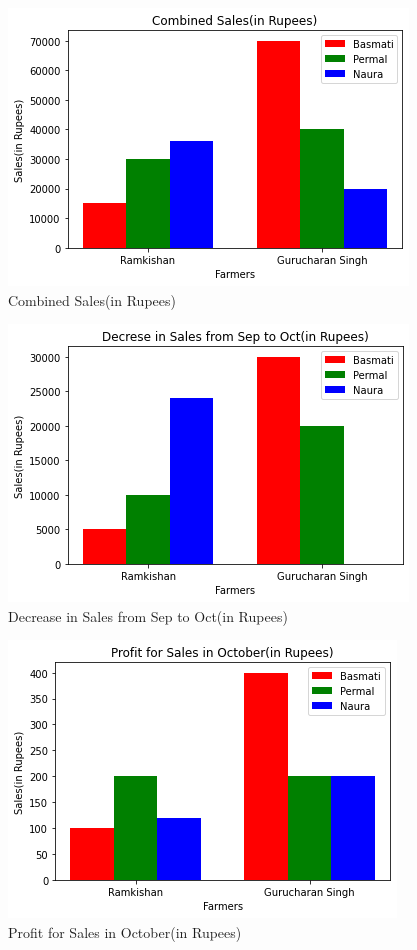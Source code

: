 \begin{figure}[!ht]
\centering
\includegraphics[width=\columnwidth]{solutions/su2021/56/Figures/Figure10_3}
\caption{Combined Sales(in Rupees)}
\label{matrix/56fig:Combined}	
\end{figure}


\begin{figure}[!ht]
\centering
\includegraphics[width=\columnwidth]{solutions/su2021/56/Figures/Figure10_4}
\caption{Decrease in Sales from Sep to Oct(in Rupees)}
\label{matrix/56fig:Decrease}	
\end{figure}


\begin{figure}[!ht]
\centering
\includegraphics[width=\columnwidth]{solutions/su2021/56/Figures/Figure10_5}
\caption{Profit for Sales in October(in Rupees)}
\label{matrix/56fig:Profit}	
\end{figure}


